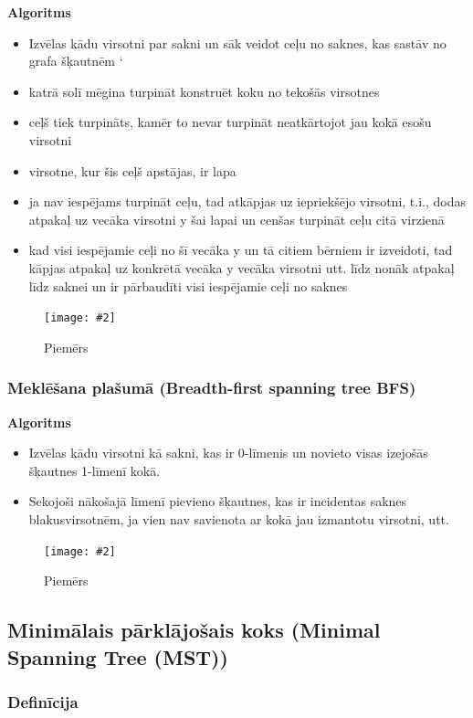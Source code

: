 \documentclass{article}
\newcommand{\illustration}[3]{
	\begin{figure}[H]
		\centering	
		\texttt{[image: \#2]}
		\caption{#3}
	\end{figure}
}
\begin{document}
\textbf{Algoritms}
\begin{itemize}
	\item Izvēlas kādu virsotni par sakni un sāk veidot ceļu no saknes, kas sastāv no grafa šķautnēm ‘
	\item katrā solī mēgina turpināt konstruēt koku no tekošās virsotnes
	\item ceļš tiek turpināts, kamēr to nevar turpināt neatkārtojot jau kokā esošu virsotni
	\item virsotne, kur šis ceļš apstājas, ir lapa
	\item ja nav iespējams turpināt ceļu, tad atkāpjas uz iepriekšējo virsotni, t.i., dodas atpakaļ uz vecāka virsotni y šai lapai un cenšas turpināt ceļu citā virzienā
	\item kad visi iespējamie ceļi no šī vecāka y un tā citiem bērniem ir izveidoti, tad kāpjas atpakaļ uz konkrētā vecāka y vecāka virsotni utt. līdz nonāk atpakaļ līdz saknei un ir pārbaudīti visi iespējamie ceļi no saknes
\end{itemize}

\illustration{1}{dfs-1}{Piemērs}

\subsubsection{Meklēšana plašumā (Breadth-first spanning tree BFS)}

\textbf{Algoritms}
\begin{itemize}
	\item Izvēlas kādu virsotni kā sakni, kas ir 0-līmenis un novieto visas izejošās šķautnes 1-līmenī kokā.
	\item Sekojoši nākošajā līmenī pievieno šķautnes, kas ir incidentas saknes blakusvirsotnēm, ja vien nav savienota ar kokā jau izmantotu virsotni, utt.
\end{itemize}

\illustration{1}{bfs-1}{Piemērs}


\subsection{Minimālais pārklājošais koks (Minimal Spanning Tree (MST))}

\subsubsection{Definīcija}
\end{document}
